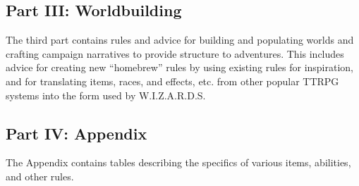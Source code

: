 \subsection{Part III: Worldbuilding}
The third part contains rules and advice for building and populating worlds
and crafting campaign narratives to provide structure to adventures.
This includes advice for creating new ``homebrew'' rules by using existing rules for inspiration,
and for translating items, races, and effects, etc. from other popular TTRPG systems into
the form used by W.I.Z.A.R.D.S.

\subsection{Part IV: Appendix}
The Appendix contains tables describing the specifics of various items, abilities, and other rules. 

